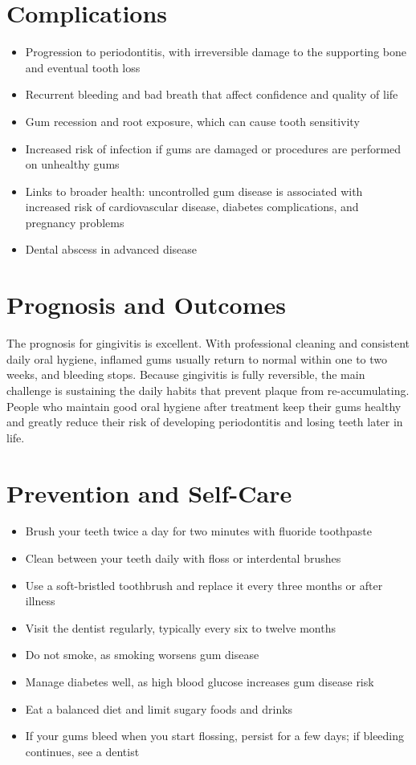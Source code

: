 \section*{Complications}
\begin{itemize}
    \item Progression to periodontitis, with irreversible damage to the supporting bone and eventual tooth loss
    \item Recurrent bleeding and bad breath that affect confidence and quality of life
    \item Gum recession and root exposure, which can cause tooth sensitivity
    \item Increased risk of infection if gums are damaged or procedures are performed on unhealthy gums
    \item Links to broader health: uncontrolled gum disease is associated with increased risk of cardiovascular disease, diabetes complications, and pregnancy problems
    \item Dental abscess in advanced disease
\end{itemize}

\section*{Prognosis and Outcomes}
The prognosis for gingivitis is excellent. With professional cleaning and consistent daily oral hygiene, inflamed gums usually return to normal within one to two weeks, and bleeding stops. Because gingivitis is fully reversible, the main challenge is sustaining the daily habits that prevent plaque from re-accumulating. People who maintain good oral hygiene after treatment keep their gums healthy and greatly reduce their risk of developing periodontitis and losing teeth later in life.

\section*{Prevention and Self-Care}
\begin{itemize}
    \item Brush your teeth twice a day for two minutes with fluoride toothpaste
    \item Clean between your teeth daily with floss or interdental brushes
    \item Use a soft-bristled toothbrush and replace it every three months or after illness
    \item Visit the dentist regularly, typically every six to twelve months
    \item Do not smoke, as smoking worsens gum disease
    \item Manage diabetes well, as high blood glucose increases gum disease risk
    \item Eat a balanced diet and limit sugary foods and drinks
    \item If your gums bleed when you start flossing, persist for a few days; if bleeding continues, see a dentist
\end{itemize}

